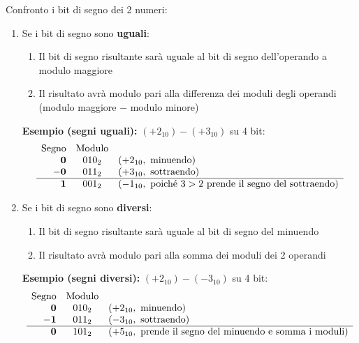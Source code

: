 Confronto i bit di segno dei 2 numeri:
\begin{enumerate}
    \item Se i bit di segno sono \textbf{uguali}:
    \begin{enumerate}[label=\theenumi.\arabic*.]
        \item Il bit di segno risultante sarà uguale al bit di segno dell'operando a modulo maggiore
        \item Il risultato avrà modulo pari alla differenza dei moduli degli operandi (modulo maggiore $-$ modulo minore)
    \end{enumerate}

    \textbf{Esempio (segni uguali):} $(+2_{10}) - (+3_{10})$ su 4 bit:
    \[
    \begin{array}{r@{\quad}c@{\quad}l}
      \text{Segno} & \text{Modulo} & \\
      \mathbf{0} & 010_2 & (+2_{10}, \text{ minuendo}) \\
    - \mathbf{0} & 011_2 & (+3_{10}, \text{ sottraendo}) \\
    \hline
      \mathbf{1} & 001_2 & (-1_{10}, \text{ poich\'e } 3 > 2 \text{ prende il segno del sottraendo})
    \end{array}
    \]

    \item Se i bit di segno sono \textbf{diversi}:
    \begin{enumerate}[label=\theenumi.\arabic*.]
        \item Il bit di segno risultante sarà uguale al bit di segno del minuendo
        \item Il risultato avrà modulo pari alla somma dei moduli dei 2 operandi
    \end{enumerate}

    \textbf{Esempio (segni diversi):} $(+2_{10}) - (-3_{10})$ su 4 bit:
    \[
    \begin{array}{r@{\quad}c@{\quad}l}
      \text{Segno} & \text{Modulo} & \\
      \mathbf{0} & 010_2 & (+2_{10}, \text{ minuendo}) \\
    - \mathbf{1} & 011_2 & (-3_{10}, \text{ sottraendo}) \\
    \hline
      \mathbf{0} & 101_2 & (+5_{10}, \text{ prende il segno del minuendo e somma i moduli})
    \end{array}
    \]
\end{enumerate}




\newpage
